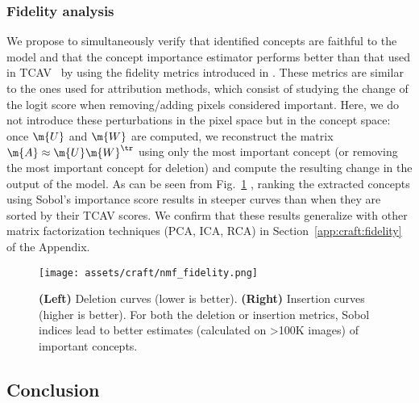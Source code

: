 \subsubsection{Fidelity analysis} \label{sec:craft:expSobol}

We propose to simultaneously verify that identified concepts are faithful to the model and that the concept importance estimator performs better than that used in TCAV~\cite{kim2018interpretability} by using the fidelity metrics introduced in \cite{ghorbani2019towards, zhang2021invertible}. These metrics are similar to the ones used for attribution methods, which consist of studying the change of the logit score when removing/adding pixels considered important. Here, we do not introduce these perturbations in the pixel space but in the concept space: once $\m{U}$ and $\m{W}$ are computed, we reconstruct the matrix $\m{A}\approx \m{U}\m{W}^\tr$ using only the most important concept (or removing the most important concept for deletion) and compute the resulting change in the output of the model.  As can be seen from Fig.~\ref{fig:craft:deletion}%
, ranking the extracted concepts using Sobol's importance score results in steeper curves than when they are sorted by their TCAV scores. %
We confirm that these results generalize with other matrix factorization techniques (PCA, ICA, RCA) in Section~\ref{app:craft:fidelity} of the Appendix.

\begin{figure}[ht]
\texttt{[image: assets/craft/nmf\_fidelity.png]}
\caption{
\textbf{(Left)} Deletion curves (lower is better). \textbf{(Right)} Insertion curves (higher is better). 
For both the deletion or insertion metrics, Sobol indices lead to better estimates (calculated on >100K images) of important concepts. %
}
\label{fig:craft:deletion}
\end{figure}




\subsection{Conclusion}

